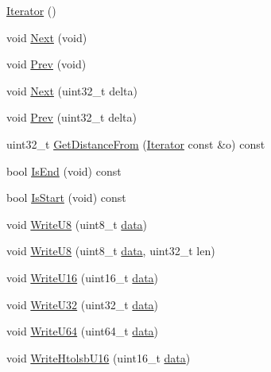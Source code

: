 \begin{DoxyCompactItemize}
\item 
\hyperlink{classns3_1_1Buffer_1_1Iterator_a7dbf27cb96700a0e3d7f893240bfe73f}{Iterator} ()
\item 
void \hyperlink{classns3_1_1Buffer_1_1Iterator_a5eaa564bdc98d063b7e94b1768aeed6b}{Next} (void)
\item 
void \hyperlink{classns3_1_1Buffer_1_1Iterator_a9913fb3b506a9f6efe46060531f051d8}{Prev} (void)
\item 
void \hyperlink{classns3_1_1Buffer_1_1Iterator_a14950dcaf94065ced59f0f123af3c3cd}{Next} (uint32\+\_\+t delta)
\item 
void \hyperlink{classns3_1_1Buffer_1_1Iterator_aa3432d454740687eef7a65a3e1de1694}{Prev} (uint32\+\_\+t delta)
\item 
uint32\+\_\+t \hyperlink{classns3_1_1Buffer_1_1Iterator_a90ff2512ad02e7449ace678d0aaf672a}{Get\+Distance\+From} (\hyperlink{classns3_1_1Buffer_1_1Iterator}{Iterator} const \&o) const 
\item 
bool \hyperlink{classns3_1_1Buffer_1_1Iterator_a6ead4dbe051fb8af68f9a1a83c94ead3}{Is\+End} (void) const 
\item 
bool \hyperlink{classns3_1_1Buffer_1_1Iterator_a586ff8219462a8aece24e8f17de31d8d}{Is\+Start} (void) const 
\item 
void \hyperlink{classns3_1_1Buffer_1_1Iterator_a3c7bacca6cbb821c9d14fa4626b7ae16}{Write\+U8} (uint8\+\_\+t \hyperlink{topology-example-sim_8cc_a26c65296e316af77b787dc77469bb2a4}{data})
\item 
void \hyperlink{classns3_1_1Buffer_1_1Iterator_a31520a724d7387124c75c326b6d4edc9}{Write\+U8} (uint8\+\_\+t \hyperlink{topology-example-sim_8cc_a26c65296e316af77b787dc77469bb2a4}{data}, uint32\+\_\+t len)
\item 
void \hyperlink{classns3_1_1Buffer_1_1Iterator_a67fdfa2b4295a6f807b9670c7c8e4c0b}{Write\+U16} (uint16\+\_\+t \hyperlink{topology-example-sim_8cc_a26c65296e316af77b787dc77469bb2a4}{data})
\item 
void \hyperlink{classns3_1_1Buffer_1_1Iterator_a0b63e75d5f552e139187aaae4b21a589}{Write\+U32} (uint32\+\_\+t \hyperlink{topology-example-sim_8cc_a26c65296e316af77b787dc77469bb2a4}{data})
\item 
void \hyperlink{classns3_1_1Buffer_1_1Iterator_a013618ba6e5a062d1b097a6109572783}{Write\+U64} (uint64\+\_\+t \hyperlink{topology-example-sim_8cc_a26c65296e316af77b787dc77469bb2a4}{data})
\item 
void \hyperlink{classns3_1_1Buffer_1_1Iterator_a2e89a2939c01994a490d6f0be22770a1}{Write\+Htolsb\+U16} (uint16\+\_\+t \hyperlink{topology-example-sim_8cc_a26c65296e316af77b787dc77469bb2a4}{data})

\end{DoxyCompactItemize}
